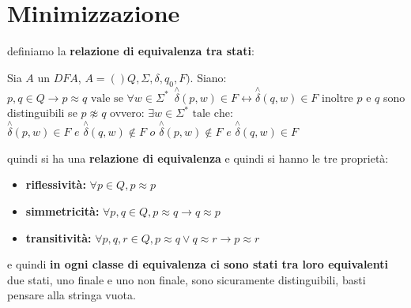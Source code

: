 \section{Minimizzazione}
definiamo la \textbf{relazione di equivalenza tra stati}:
\begin{definition}
	Sia $A$ un $DFA$, $A=()Q,\Sigma,\delta,q_0,F)$. Siano:
	$p,q\in Q\to p\approx q\text{ vale se } \forall w \in \Sigma^*\,\,\, \stackrel{\wedge}{\delta}(p,w)\in F\longleftrightarrow \stackrel{\wedge}{\delta}(q,w)\in F$
	inoltre $p$ e $q$ sono distinguibili se $p\not\approx q$ ovvero:
	$\exists w\in \Sigma^*\text{ tale che:} $
	$\stackrel{\wedge}{\delta}(p,w)\in F \,\,e\,\,\stackrel{\wedge}{\delta}(q,w)\not\in F\,\,o\,\,\stackrel{\wedge}{\delta}(p,w)\not\in F \,\,e\,\,\stackrel{\wedge}{\delta}(q,w)\in F$
\end{definition}
quindi si ha una \textbf{relazione di equivalenza} e quindi si hanno le tre proprietà:
\begin{itemize}
	\item \textbf{riflessività:} $\forall p\in Q, p\approx p$
	\item \textbf{simmetricità:} $\forall p,q\in Q, p\approx q\to q\approx p$
	\item \textbf{transitività:} $\forall p,q,r\in Q, p\approx q\vee q\approx r\to p\approx r$
\end{itemize}
e quindi \textbf{in ogni classe di equivalenza ci sono stati tra loro equivalenti}
due stati, uno finale e uno non finale, sono sicuramente distinguibili, basti pensare alla stringa vuota.
